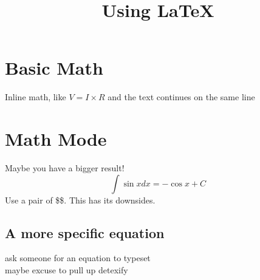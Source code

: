 \documentclass[12pt, letterpaper]{article}
\title{Using \LaTeX}
\begin{document}
\maketitle
\section{Basic Math}
Inline math, like \(V = I \times R\) and the text continues on the same line
\section{Math Mode}
Maybe you have a bigger result!
\[
    \int \sin{x} dx = -\cos{x} + C
\]
Use a pair of \$\$. This has its downsides.
\subsection{A more specific equation}
ask someone for an equation to typeset\\
maybe excuse to pull up detexify
\end{document}
